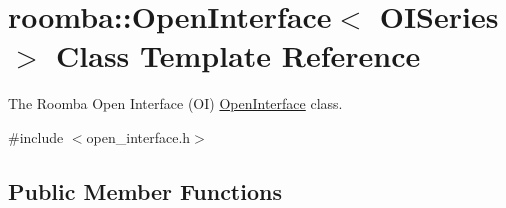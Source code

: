 \hypertarget{classroomba_1_1_open_interface}{\section{roomba\+:\+:Open\+Interface$<$ O\+I\+Series $>$ Class Template Reference}
\label{classroomba_1_1_open_interface}
}


The Roomba Open Interface (O\+I) \hyperlink{classroomba_1_1_open_interface}{Open\+Interface} class.  




{\ttfamily \#include $<$open\+\_\+interface.\+h$>$}

\subsection*{Public Member Functions}
